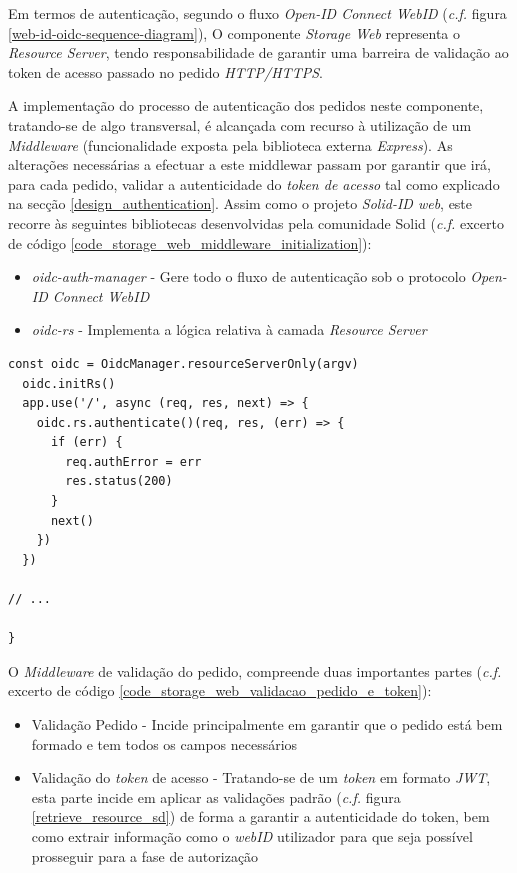 Em termos de autenticação, segundo o fluxo \emph{Open-ID Connect WebID} (\emph{c.f.} figura \ref{web-id-oidc-sequence-diagram}), O componente \emph{Storage Web} representa o \emph{Resource Server}, tendo responsabilidade de garantir uma barreira de validação ao token de acesso passado no pedido \emph{HTTP/HTTPS}.

A implementação do processo de autenticação dos pedidos neste componente, tratando-se de algo transversal, é alcançada com recurso à utilização de um \emph{Middleware} (funcionalidade exposta pela biblioteca externa \emph{Express}). As alterações necessárias a efectuar a este middlewar passam por garantir que irá, para cada pedido, validar a autenticidade do \emph{token de acesso} tal como explicado na secção \ref{design_authentication}.
Assim como o projeto \emph{Solid-ID web}, este recorre às seguintes bibliotecas desenvolvidas pela comunidade Solid (\emph{c.f.} excerto de código \ref{code_storage_web_middleware_initialization}):
\begin{itemize}
    \item \emph{oidc-auth-manager} - Gere todo o fluxo de autenticação sob o protocolo \emph{Open-ID Connect WebID}
    \item \emph{oidc-rs} - Implementa a lógica relativa à camada \emph{Resource Server}
\end{itemize}

\begin{lstlisting}[caption={Inicialização do \emph{Middleware} de autenticação de pedidos REST}, label={code_storage_web_middleware_initialization}]
  const oidc = OidcManager.resourceServerOnly(argv)
  oidc.initRs()
  app.use('/', async (req, res, next) => {
    oidc.rs.authenticate()(req, res, (err) => {
      if (err) {
        req.authError = err
        res.status(200)
      }
      next()
    })
  })

// ...

}

\end{lstlisting}

O \emph{Middleware} de validação do pedido, compreende duas importantes partes (\emph{c.f.} excerto de código \ref{code_storage_web_validacao_pedido_e_token}):
\begin{itemize}
    \item Validação Pedido - Incide principalmente em garantir que o pedido está bem formado e tem todos os campos necessários
    \item Validação do \emph{token} de acesso - Tratando-se de um \emph{token} em formato \emph{JWT}, esta parte incide em aplicar as validações padrão (\emph{c.f.} figura \ref{retrieve_resource_sd}) de forma a garantir a autenticidade do token, bem como extrair informação como o \emph{webID} utilizador para que seja possível prosseguir para a fase de autorização
\end{itemize}

